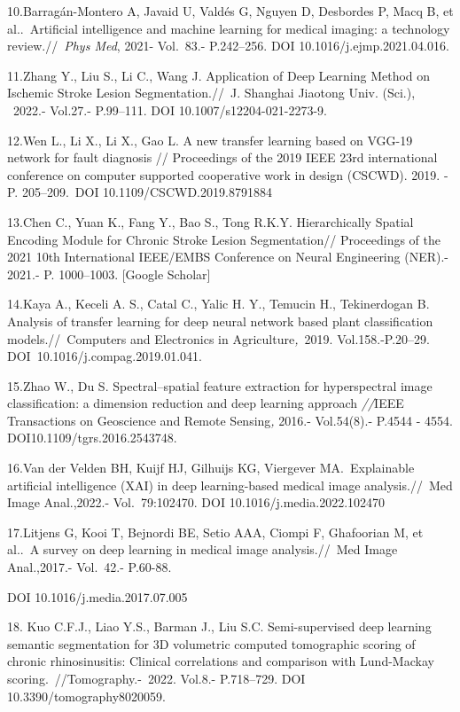 \begin{noparindent}
10.Barragán-Montero A, Javaid U, Valdés G, Nguyen D, Desbordes P, Macq
B, et al..~Artificial intelligence and machine learning for medical
imaging: a technology review.//~\emph{Phys Med}, 2021- Vol.~83.-
P.242--256. DOI 10.1016/j.ejmp.2021.04.016.

11.Zhang Y., Liu S., Li C., Wang J. Application of Deep Learning Method
on Ischemic Stroke Lesion Segmentation.//~J. Shanghai Jiaotong Univ.
(Sci.), ~2022.- Vol.27.- P.99--111. DOI 10.1007/s12204-021-2273-9.~

12.Wen L., Li X., Li X., Gao L. A new transfer learning based on VGG-19
network for fault diagnosis // Proceedings of the 2019 IEEE 23rd
international conference on computer supported cooperative work in
design (CSCWD). 2019. - P. 205--209.~DOI 10.1109/CSCWD.2019.8791884

13.Chen C., Yuan K., Fang Y., Bao S., Tong R.K.Y. Hierarchically Spatial
Encoding Module for Chronic Stroke Lesion Segmentation// Proceedings of
the 2021 10th International IEEE/EMBS Conference on Neural Engineering
(NER).- 2021.- P. 1000--1003. {[}Google Scholar{]}

14.Kaya A., Keceli A. S., Catal C., Yalic H. Y., Temucin H.,
Tekinerdogan B. Analysis of transfer learning for deep neural network
based plant classification models.//~Computers and Electronics in
Agriculture\emph{,~}2019. Vol.158.-P.20--29.
DOI~10.1016/j.compag.2019.01.041.~

15.Zhao W., Du S. Spectral--spatial feature extraction for hyperspectral
image classification: a dimension reduction and deep learning approach
\emph{//}IEEE Transactions on Geoscience and Remote Sensing\emph{,}
2016.- Vol.54(8).- P.4544 - 4554. DOI10.1109/tgrs.2016.2543748.~

16.Van der Velden BH, Kuijf HJ, Gilhuijs KG, Viergever MA.~Explainable
artificial intelligence (XAI) in deep learning-based medical image
analysis.//~Med Image Anal.,2022.- Vol.~79:102470. DOI
10.1016/j.media.2022.102470

17.Litjens G, Kooi T, Bejnordi BE, Setio AAA, Ciompi F, Ghafoorian M, et
al..~A survey on deep learning in medical image analysis.//~Med Image
Anal.,2017.- Vol.~42.- P.60-88.

DOI 10.1016/j.media.2017.07.005

18. Kuo C.F.J., Liao Y.S., Barman J., Liu S.C. Semi-supervised deep
learning semantic segmentation for 3D volumetric computed tomographic
scoring of chronic rhinosinusitis: Clinical correlations and comparison
with Lund-Mackay scoring.~//Tomography.-\emph{~}2022. Vol.8.-
P.718--729. DOI 10.3390/tomography8020059.~


\end{noparindent}
